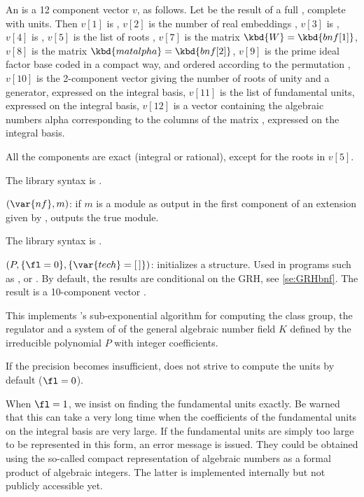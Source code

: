 An  is a 12 component vector $v$, as follows. Let  be
the result of a full , complete with units. Then $v[1]$ is
, $v[2]$ is the number of real embeddings ,
$v[3]$ is , $v[4]$ is , $v[5]$ is the list of roots
, $v[7]$ is the matrix $\kbd{W} = \kbd{bnf[1]}$,
$v[8]$ is the matrix $\kbd{matalpha}=\kbd{bnf[2]}$,
$v[9]$ is the prime ideal factor base  coded in a compact way,
and ordered according to the permutation , $v[10]$ is the
2-component vector giving the number of roots of unity and a generator,
expressed on the integral basis, $v[11]$ is the list of fundamental units,
expressed on the integral basis, $v[12]$ is a vector containing the algebraic
numbers alpha corresponding to the columns of the matrix ,
expressed on the integral basis.

All the components are exact (integral or rational), except for the roots in
$v[5]$.

The library syntax is .

$(\var{nf},m)$: \label{se:bnfdecodemodule}if $m$ is a module as output in the
first component of an extension given by , outputs the
true module.

The library syntax is .

$(P,\{\fl=0\},\{\var{tech}=[\,]\})$: \label{se:bnfinit}initializes a
 structure. Used in programs such as ,
 or . By default, the results are conditional
on the GRH, see \ref{se:GRHbnf}. The result is a
10-component vector .

This implements 's sub-exponential algorithm for computing the
class group, the regulator and a system of  of the
general algebraic number field $K$ defined by the irreducible polynomial $P$
with integer coefficients.

If the precision becomes insufficient,  does not strive to compute
the units by default ($\fl=0$).

When $\fl=1$, we insist on finding the fundamental units exactly. Be
warned that this can take a very long time when the coefficients of the
fundamental units on the integral basis are very large. If the fundamental
units are simply too large to be represented in this form, an error message
is issued. They could be obtained using the so-called compact representation
of algebraic numbers as a formal product of algebraic integers. The latter is
implemented internally but not publicly accessible yet.

